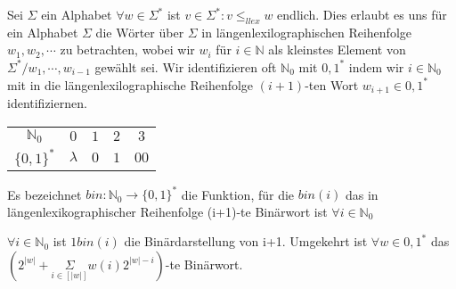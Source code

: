  Sei $\Sigma$ ein Alphabet $\forall w \in \Sigma^{*}$ ist ${v\in \Sigma^{*} : v \leq_{llex}w}$ endlich. Dies erlaubt es uns für ein Alphabet $\Sigma$ die Wörter über $\Sigma$ in längenlexilographischen Reihenfolge $w_{1}, w_{2}, \cdots$ zu betrachten, wobei wir $w_{i}$ für $i \in \mathbb{N}$ als kleinstes Element von $\Sigma^{*}/{w_{1},\cdots, w_{i-1}}$ gewählt sei. Wir identifizieren oft $\mathbb{N}_{0}$ mit ${0, 1}^{*}$ indem wir $i \in \mathbb{N}_{0}$ mit in die längenlexilographische Reihenfolge $(i+1)$-ten Wort $w_{i+1} \in {0,1}^{*}$ identifiziernen.
\begin{center}
    \begin{tabular}{ c c c c c }
        $\mathbb{N}_{0}$ & $0$ & $1$ & $2$ & $3$\\ 
        $\{0, 1\}^{*}$ & $\lambda$ & $0$ & $1$ & $00$\\   
    \end{tabular}
\end{center}

 Es bezeichnet $bin : \mathbb{N}_{0} \rightarrow \{0, 1\}^{*}$ die Funktion, für die $bin(i)$ das in längenlexikographischer Reihenfolge (i+1)-te Binärwort ist $\forall i \in \mathbb{N}_{0}$

$\forall i \in \mathbb{N}_{0}$ ist $1 bin(i)$ die Binärdarstellung von i+1. Umgekehrt ist $\forall w \in {0, 1}^{*}$ das $(2^{|w|} + \underset{i \in [|w|]}{\Sigma} w(i) 2^{|w|-i})$-te Binärwort.
